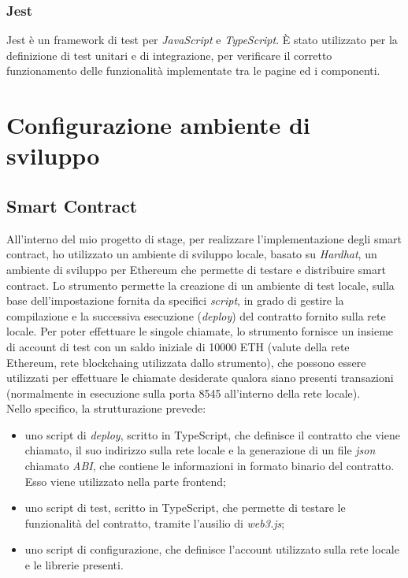 \subsubsection{Jest}
Jest è un framework di test per \textit{JavaScript} e \textit{TypeScript}. È stato utilizzato per la definizione di test unitari e di integrazione, per verificare il corretto funzionamento
delle funzionalità implementate tra le pagine ed i componenti.

\section{Configurazione ambiente di sviluppo}\label{sec:configurazione-ambiente}

\subsection{Smart Contract}
All'interno del mio progetto di stage, per realizzare l'implementazione degli smart contract, ho utilizzato un ambiente di sviluppo locale,
basato su \textit{Hardhat}, un ambiente di sviluppo per Ethereum che permette di testare e distribuire smart contract.
Lo strumento permette la creazione di un ambiente di test locale, sulla base dell'impostazione fornita da specifici \textit{script}, in
grado di gestire la compilazione e la successiva esecuzione (\textit{deploy}) del contratto fornito sulla rete locale.
Per poter effettuare le singole chiamate, lo strumento fornisce un insieme di account di test con un saldo iniziale di 10000 ETH (valute della rete Ethereum, rete \gls{blockchaing} utilizzata dallo strumento), 
che possono essere utilizzati per effettuare le chiamate desiderate qualora siano presenti transazioni (normalmente in esecuzione sulla porta 8545 all'interno della rete locale). \\

Nello specifico, la strutturazione prevede:
\begin{itemize}
    \item uno script di \textit{deploy}, scritto in TypeScript, che definisce il contratto che viene chiamato, il suo indirizzo sulla rete locale
    e la generazione di un file \textit{json} chiamato \textit{ABI}, che contiene le informazioni in formato binario del contratto. Esso viene utilizzato nella parte frontend;
    \item uno script di test, scritto in TypeScript, che permette di testare le funzionalità del contratto, tramite l'ausilio di \textit{web3.js};
    \item uno script di configurazione, che definisce l'account utilizzato sulla rete locale e le librerie presenti.
\end{itemize}

